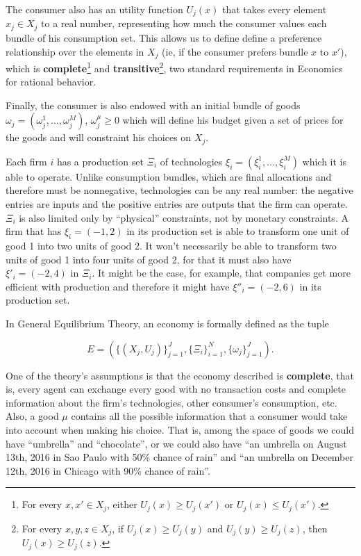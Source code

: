 The consumer also has an utility function $U_j(x)$ that takes every
element $x_j \in X_j$ to a real number, representing how much the
consumer values each bundle of his consumption set. This allows us to
define define a preference relationship over the elements in $X_j$
(ie, if the consumer prefers bundle $x$ to $x'$), which is
\textbf{complete}\footnote{For every $x, x' \in X_j$, either
  $U_j(x) \geq U_j(x')$ or $U_j(x) \leq U_j(x')$.} and
\textbf{transitive}\footnote{For every $x, y, z \in X_j$, if
  $U_j(x) \geq U_j(y)$ and $U_j(y) \geq U_j(z)$, then
  $U_j(x) \geq U_j(z)$.}, two standard requirements in Economics for
rational behavior.

Finally, the consumer is also endowed with an initial bundle of goods
$\omega_j = (\omega_j^1, \ldots, \omega_j^M)$, $\omega_j^\mu \geq 0$
which will define his budget given a set of prices for the goods and
will constraint his choices on $X_j$.

Each firm $i$ has a production set $\Xi_i$ of technologies
$\xi_i = (\xi_i^1, \ldots, \xi_i^M)$ which it is able to operate. Unlike
consumption bundles, which are final allocations and therefore must be
nonnegative, technologies can be any real number: the negative entries
are inputs and the positive entries are outputs that the firm can
operate. $\Xi_i$ is also limited only by ``physical'' constraints, not
by monetary constraints. A firm that has $\xi_i = (-1, 2)$ in its
production set is able to transform one unit of good 1 into two units
of good 2. It won't necessarily be able to transform two units of good
1 into four units of good 2, for that it must also have $\xi'_i = (-2,
4)$ in $\Xi_i$. It might be the case, for example, that companies get more efficient
with production and therefore it might have $\xi''_i = (-2, 6)$ in its
production set.

In General Equilibrium Theory, an economy is formally defined as the tuple

\begin{equation}
  E = \left(\{(X_j,U_j)\}_{j=1}^J,
    \{\Xi_i\}_{i=1}^N, \{\omega_j\}_{j=1}^J \right).\label{eq:econGE}
\end{equation}

One of the theory's assumptions is that the economy described is
\textbf{complete}, that is, every agent can exchange every good with no
transaction costs and complete information about the firm's
technologies, other consumer's consumption, etc. Also, a good $\mu$
contains all the possible information that a consumer would take into
account when making his choice. That is, among the space of goods we
could have ``umbrella'' and ``chocolate'', or we could also have ``an
umbrella on August 13th, 2016 in Sao Paulo with 50\% chance of rain''
and ``an umbrella on December 12th, 2016 in Chicago with 90\% chance
of rain''. 

